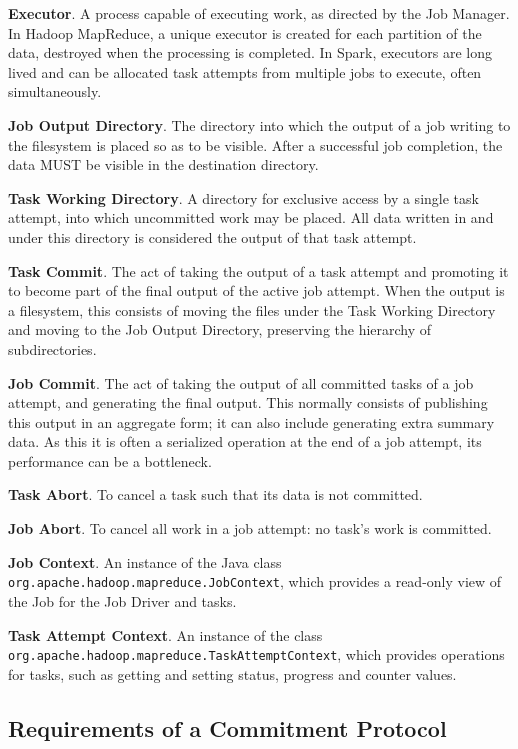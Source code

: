 \documentclass[format=acmsmall, screen=true, review=false]{acmart}
\begin{document}
\textbf{Executor}.
A process capable of executing work, as directed by the Job Manager.
In Hadoop MapReduce, a unique executor is created for each partition
of the data, destroyed when the processing is completed.
In Spark, executors are long lived and can be allocated task attempts from multiple
jobs to execute, often simultaneously.

\textbf{Job Output Directory}.
The directory into which the output of a job writing to the filesystem is placed
so as to be visible.
After a successful job completion, the data MUST be visible in the destination
directory.

\textbf{Task Working Directory}.
A directory for exclusive access by a single task attempt, into which uncommitted
work may be placed.
All data written in and under this directory is considered the output of
that task attempt.


\textbf{Task Commit}.
The act of taking the output of a task attempt
and promoting it to become part of the final output of the active job
attempt.
When the output is a filesystem, this consists of moving the files
under the Task Working Directory and moving to the Job Output Directory,
preserving the hierarchy of subdirectories.


\textbf{Job Commit}.
The act of taking the output of all committed tasks of a job attempt,
and generating the final output.
This normally consists of publishing this output in an aggregate form;
it can also include generating extra summary data.
As this it is often a serialized operation at the end of a job attempt,
its performance can be a bottleneck.

\textbf{Task Abort}.
To cancel a task such that its data is not committed.

\textbf{Job Abort}.
To cancel all work in a job attempt: no task's work is committed.


\textbf{Job Context}.
An instance of the Java class \texttt{org.apache.hadoop.mapreduce.JobContext},
which provides a read-only view of the Job for the Job Driver and tasks.

\textbf{Task Attempt Context}.
An instance of the class
\texttt{org.apache.hadoop.mapreduce.TaskAttemptContext},
which provides operations for tasks, such as getting and setting status,
progress and counter values.


\subsection{Requirements of a Commitment Protocol}
\label{subsec:commit-protocol-requirements}
\end{document}
